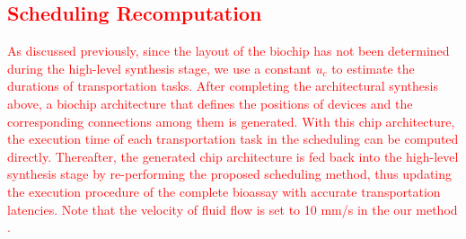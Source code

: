 \subsection{\textcolor{red}{Scheduling Recomputation}}\label{sec:schedual_recomputation}
\textcolor{red}{
As discussed previously, since the layout of the biochip has not been determined during the high-level synthesis stage, we use a constant $u_c$ to estimate the durations of transportation tasks. After completing the architectural synthesis above, a biochip architecture that defines the  positions of devices and the corresponding connections among them is generated. With this chip architecture, the execution time of each transportation task in the scheduling can be computed directly. Thereafter, the generated chip architecture is fed back into the high-level synthesis stage by re-performing the proposed scheduling method, thus updating the execution procedure of the complete bioassay with accurate transportation latencies. Note that the velocity of fluid flow is set to 10 mm/s in the our method \cite{minhass2012architectural}.
}










